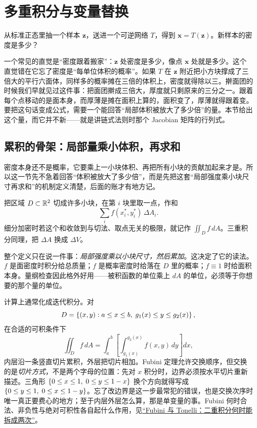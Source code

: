 \section{多重积分与变量替换}
\label{sec:02-Calculus/06-Multivariable-Calculus/07}

从标准正态里抽一个样本 \(\mathbf z\)，送进一个可逆网络 \(T\)，得到 \(\mathbf x=T(\mathbf z)\)。新样本的密度是多少？

一个常见的直觉是``密度跟着搬家''：\(\mathbf z\) 处密度是多少，像点 \(\mathbf x\) 处就是多少。这个直觉错在它忘了密度是``每单位体积的概率''。如果 \(T\) 在 \(\mathbf z\) 附近把小方块撑成了三倍大的平行六面体，同样多的概率摊在三倍的体积上，密度就得除以三。擀面团的时候我们早就见过这件事：把面团擀成三倍大，厚度就只剩原来的三分之一。跟着每个点移动的是面本身，而厚薄是摊在面积上算的，面积变了，厚薄就得跟着变。要把这句话变成公式，需要一个能回答``局部体积被放大了多少倍''的量。本节给出这个量，而它并不新——就是讲链式法则时那个 Jacobian 矩阵的行列式。

\subsection{累积的骨架：局部量乘小体积，再求和}

密度本身还不是概率，它要乘上一小块体积、再把所有小块的贡献加起来才是。所以这一节先不急着回答``体积被放大了多少倍''，而是先把这套``局部强度乘小块尺寸再求和''的机制定义清楚，后面的账才有地方记。

把区域 \(D\subset\mathbb{R}^2\) 切成许多小块，在第 \(i\) 块里取一点，作和
\[
\sum_i f(x_i^*,y_i^*)\,\Delta A_i .
\]
细分加密时若这个和收敛到与切法、取点无关的极限，就记作 \(\iint_D f\,dA\)。三重积分同理，把 \(\Delta A\) 换成 \(\Delta V\)。

整个定义只在说一件事：\emph{局部强度乘以小块尺寸，然后累加}。这决定了它的读法。\(f\) 是面密度时积分给总质量；\(f\) 是概率密度时给落在 \(D\) 里的概率；\(f\equiv1\) 时给面积本身。量纲检查因此格外好用——被积函数的单位乘上 \(dA\) 的单位，必须等于你想要的那个量的单位。

计算上通常化成迭代积分。对
\[
D=\left\{(x,y):a\le x\le b,\;g_1(x)\le y\le g_2(x)\right\},
\]
在合适的可积条件下
\[
\iint_D f\,dA=\int_a^b\!\!\left[\int_{g_1(x)}^{g_2(x)}f(x,y)\,dy\right]dx,
\]
内层沿一条竖直切片累积，外层把切片相加。Fubini 定理允许交换顺序，但交换的是\emph{切片方式}，不是两个字母的位置：先对 \(x\) 积分时，边界必须按水平切片重新描述。三角形 \(\left\{0\le x\le1,\;0\le y\le1-x\right\}\) 换个方向就得写成 \(\left\{0\le y\le1,\;0\le x\le1-y\right\}\)。忘了改边界是这一步最常犯的错误，也是交换次序时唯一真正要费心的地方；至于内层外层怎么算，那是单变量的事。Fubini 何时合法、非负性与绝对可积性各自起什么作用，见\hyperref[sec:12-Real-Analysis-Support/06-Product-Measures-and-Fubini/02]{``Fubini 与 Tonelli：二重积分何时能拆成两次''}。

